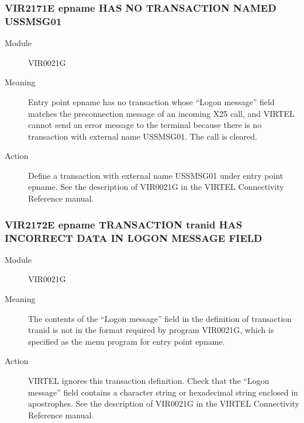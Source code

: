\documentclass[letterpaper,10pt,english]{sphinxmanual}
\begin{document}
\subsubsection{VIR2171E epname HAS NO TRANSACTION NAMED USSMSG01}
\label{\detokenize{messages:vir2171e-epname-has-no-transaction-named-ussmsg01}}\begin{description}
\item[{Module}] \leavevmode
VIR0021G

\item[{Meaning}] \leavevmode
Entry point epname has no transaction whose “Logon message” field matches the preconnection message of an incoming X25 call, and VIRTEL cannot send an error message to the terminal because there is no transaction with external name USSMSG01. The call is cleared.

\item[{Action}] \leavevmode
Define a transaction with external name USSMSG01 under entry point epname. See the description of VIR0021G in the VIRTEL Connectivity Reference manual.

\end{description}


\subsubsection{VIR2172E epname TRANSACTION tranid HAS INCORRECT DATA IN LOGON MESSAGE FIELD}
\label{\detokenize{messages:vir2172e-epname-transaction-tranid-has-incorrect-data-in-logon-message-field}}\begin{description}
\item[{Module}] \leavevmode
VIR0021G

\item[{Meaning}] \leavevmode
The contents of the “Logon message” field in the definition of transaction tranid is not in the format required by program VIR0021G, which is specified as the menu program for entry point epname.

\item[{Action}] \leavevmode
VIRTEL ignores this transaction definition. Check that the “Logon message” field contains a character string or hexadecimal string enclosed in apostrophes. See the description of VIR0021G in the VIRTEL Connectivity Reference manual.

\end{description}
\end{document}
